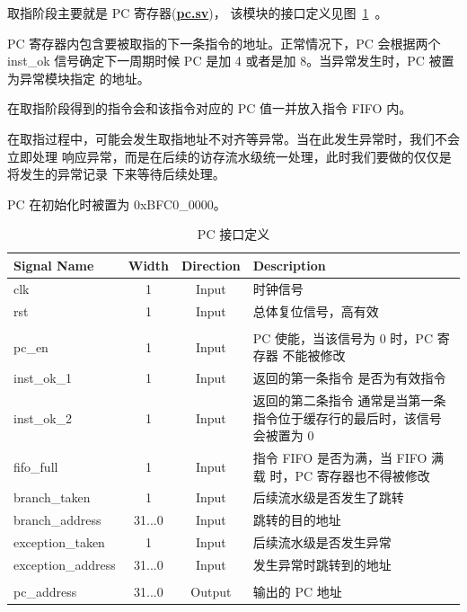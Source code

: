 \documentclass[blue,normal,cn,hide]{elegantbook}
\begin{document}
取指阶段主要就是 PC 寄存器(\href{https://github.com/name1e5s/Sirius/blob/master/pc.sv}{\textbf{pc.sv}})，
该模块的接口定义见图~\ref{tab:PCInterface}~。

PC 寄存器内包含要被取指的下一条指令的地址。正常情况下，PC 会根据两个 inst\_ok
信号确定下一周期时候 PC 是加 4 或者是加 8。当异常发生时，PC 被置为异常模块指定
的地址。

在取指阶段得到的指令会和该指令对应的 PC 值一并放入指令 FIFO 内。

在取指过程中，可能会发生取指地址不对齐等异常。当在此发生异常时，我们不会立即处理
响应异常，而是在后续的访存流水级统一处理，此时我们要做的仅仅是将发生的异常记录
下来等待后续处理。

PC 在初始化时被置为 0xBFC0\_0000。

\begin{table}
    \renewcommand\arraystretch{1.25}
    \centering
    \begin{tabular}{lccm{}}
        \toprule 
        \rowcolor{black!20} \textbf{Signal Name} & \textbf{Width} & \textbf{Direction} & \textbf{Description} \\
        \midrule
        clk & 1 & Input & 时钟信号 \\
        rst & 1 & Input & 总体复位信号，高有效 \\
        \\
        pc\_en & 1 & Input & PC 使能，当该信号为 0 时，PC 寄存器
        不能被修改 \\
        inst\_ok\_1 & 1 & Input & 返回的第一条指令
        是否为有效指令 \\
        inst\_ok\_2 & 1 & Input & 返回的第二条指令
        通常是当第一条指令位于缓存行的最后时，该信号会被置为 0 \\
        fifo\_full & 1 & Input & 指令 FIFO 是否为满，当 FIFO 满载
        时，PC 寄存器也不得被修改 \\
        branch\_taken & 1 & Input & 后续流水级是否发生了跳转 \\
        branch\_address & 31...0 & Input & 跳转的目的地址 \\ 
        exception\_taken & 1 & Input & 后续流水级是否发生异常 \\
        exception\_address & 31...0 & Input & 发生异常时跳转到的地址 \\
        \\
        pc\_address & 31...0 & Output & 输出的 PC 地址 \\
        \bottomrule
    \end{tabular}
    \caption{PC 接口定义}
    \label{tab:PCInterface}
\end{table}
\end{document}
